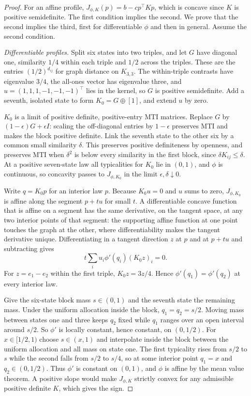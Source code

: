 \documentclass[11pt,a4paper]{article}
\theoremstyle{remark}
\begin{document}
\begin{proof}
For an affine profile, $J_{\phi,K}(p)=b-cp^\top Kp$, which is concave since $K$ is positive semidefinite. The first condition implies the second. We prove that the second implies the third, first for differentiable $\phi$ and then in general. Assume the second condition.

\emph{Differentiable profiles.} Split six states into two triples, and let $G$ have diagonal one, similarity $1/4$ within each triple and $1/2$ across the triples. These are the entries $(1/2)^{d_{ij}}$ for graph distance on $K_{3,3}$. The within-triple contrasts have eigenvalue $3/4$, the all-ones vector has eigenvalue three, and $u=(1,1,1,-1,-1,-1)^\top$ lies in the kernel, so $G$ is positive semidefinite. Add a seventh, isolated state to form $K_0=G\oplus[1]$, and extend $u$ by zero.

$K_0$ is a limit of positive definite, positive-entry MTI matrices. Replace $G$ by $(1-\epsilon)G+\epsilon I$: scaling the off-diagonal entries by $1-\epsilon$ preserves MTI and makes the block positive definite. Link the seventh state to the other six by a common small similarity $\delta$. This preserves positive definiteness by openness, and preserves MTI when $\delta^2$ is below every similarity in the first block, since $\delta K_{ij}\le\delta$. At a positive seven-state law all typicalities for $K_0$ lie in $(0,1)$, and $\phi$ is continuous, so concavity passes to $J_{\phi,K_0}$ in the limit $\epsilon,\delta\downarrow0$.

Write $q=K_0p$ for an interior law $p$. Because $K_0u=0$ and $u$ sums to zero, $J_{\phi,K_0}$ is affine along the segment $p+tu$ for small $t$. A differentiable concave function that is affine on a segment has the same derivative, on the tangent space, at any two interior points of that segment: the supporting affine function at one point touches the graph at the other, where differentiability makes the tangent derivative unique. Differentiating in a tangent direction $z$ at $p$ and at $p+tu$ and subtracting gives
\[
 t\sum_i u_i\phi'(q_i)(K_0z)_i=0 .
\]
For $z=e_1-e_2$ within the first triple, $K_0z=3z/4$. Hence $\phi'(q_1)=\phi'(q_2)$ at every interior law.

Give the six-state block mass $s\in(0,1)$ and the seventh state the remaining mass. Under the uniform allocation inside the block, $q_1=q_2=s/2$. Moving mass between states one and three keeps $q_2$ fixed while $q_1$ ranges over an open interval around $s/2$. So $\phi'$ is locally constant, hence constant, on $(0,1/2)$. For $x\in[1/2,1)$ choose $s\in(x,1)$ and interpolate inside the block between the uniform allocation and all mass on state one. The first typicality rises from $s/2$ to $s$ while the second falls from $s/2$ to $s/4$, so at some interior point $q_1=x$ and $q_2\in(0,1/2)$. Thus $\phi'$ is constant on $(0,1)$, and $\phi$ is affine by the mean value theorem. A positive slope would make $J_{\phi,K}$ strictly convex for any admissible positive definite $K$, which gives the sign.


\end{proof}
\end{document}

